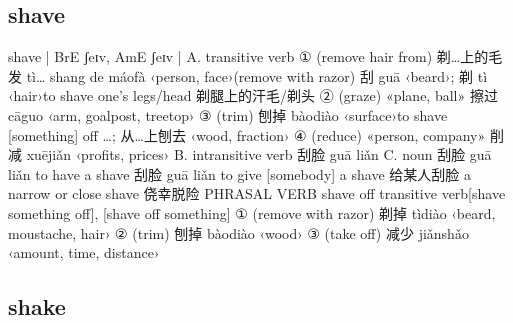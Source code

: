 \documentclass[11pt]{ctexart}
\begin{document}
{{{{\subsection{shave}
\label{sec:orgb63680f}
shave | BrE ʃeɪv, AmE ʃeɪv |
A. transitive verb
① (remove hair from) 剃…上的毛发 tì… shang de máofà ‹person, face›(remove with razor) 刮 guā ‹beard›; 剃 tì ‹hair›to shave one's legs/head 剃腿上的汗毛/剃头
② (graze) «plane, ball» 擦过 cāguo ‹arm, goalpost, treetop›
③ (trim) 刨掉 bàodiào ‹surface›to shave [something] off …; 从…上刨去 ‹wood, fraction›
④ (reduce) «person, company» 削减 xuējiǎn ‹profits, prices›
B. intransitive verb 刮脸 guā liǎn
C. noun 刮脸 guā liǎn to have a shave 刮脸 guā liǎn to give [somebody] a shave 给某人刮脸 a narrow or close shave 侥幸脱险 PHRASAL VERB shave off transitive verb[shave something off], [shave off something]
① (remove with razor) 剃掉 tìdiào ‹beard, moustache, hair›
② (trim) 刨掉 bàodiào ‹wood›
③ (take off) 减少 jiǎnshǎo ‹amount, time, distance›
\subsection{shake}
\label{sec:org6af0fb4}

}}}}
\end{document}
